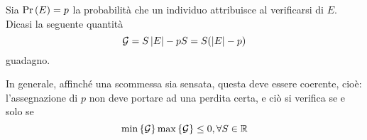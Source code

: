 \documentclass{subfiles}
\begin{document}
\begin{Definition*}
    Sia \(\Prob{E} = p\) la probabilità che un individuo attribuisce al verificarsi di \(E\).
    Dicasi la seguente quantità
    \[
        \mathcal{G} = S \left\vert {E} \right\vert - pS = S(\left\vert {E} \right\vert - p)
    \]
    guadagno.
\end{Definition*}
In generale, affinché una scommessa sia sensata, questa deve essere coerente, cioè:
l'assegnazione di \(p\) non deve portare ad una perdita certa, e ciò si verifica se e solo se
\[
    \Min*{\mathcal{G}} \Max*{\mathcal{G}} \le 0, \forall S \in \Real
\]
\end{document}
